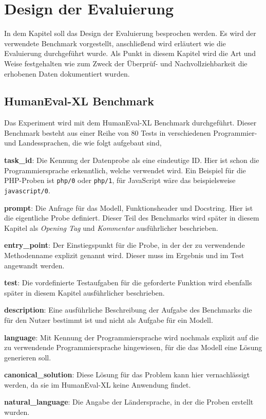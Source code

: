 

\section{Design der Evaluierung}
In dem Kapitel soll das Design der Evaluierung besprochen werden. Es wird der verwendete Benchmark vorgestellt, anschließend wird erläutert wie die Evaluierung durchgeführt wurde. Als Punkt in diesem Kapitel wird die Art und Weise festgehalten wie zum Zweck der Überprüf- und Nachvollziehbarkeit die erhobenen Daten dokumentiert wurden.

\subsection{HumanEval-XL Benchmark}\label{subsec:structor_of_humaneval_xl}
Das Experiment wird mit dem HumanEval-XL Benchmark durchgeführt. Dieser Benchmark besteht aus einer Reihe von 80 Tests in verschiedenen Programmier- und Landessprachen, die wie folgt aufgebaut sind,

\begin{myenumerate}
	\item \textbf{task\_id}: Die Kennung der Datenprobe als eine eindeutige ID. Hier ist schon die Programmiersprache erkenntlich, welche verwendet wird. Ein Beispiel für die PHP-Proben ist \texttt{php/0} oder \texttt{php/1}, für JavaScript wäre das beispielsweise \texttt{javascript/0}.
	\item \textbf{prompt}: Die Anfrage für das Modell, Funktionsheader und Docstring. Hier ist die eigentliche Probe definiert. Dieser Teil des Benchmarks wird später in diesem Kapitel als \textit{Opening Tag} und \textit{Kommentar} ausführlicher beschrieben.
	\item \textbf{entry\_point}: Der Einstiegspunkt für die Probe, in der der zu verwendende Methodenname explizit genannt wird. Dieser muss im Ergebnis und im Test angewandt werden.
	\item \textbf{test}: Die vordefinierte Testaufgaben für die geforderte Funktion wird ebenfalls später in diesem Kapitel ausführlicher beschrieben.
	\item \textbf{description}: Eine ausführliche Beschreibung der Aufgabe des Benchmarks die für den Nutzer bestimmt ist und nicht als Aufgabe für ein Modell.
	\item \textbf{language}: Mit Kennung der Programmiersprache wird nochmals explizit auf die zu verwendende Programmiersprache hingewiesen, für die das Modell eine Lösung generieren soll.
	\item \textbf{canonical\_solution}: Diese Lösung für das Problem kann hier vernachlässigt werden, da sie im HumanEval-XL keine Anwendung findet.
	\item \textbf{natural\_language}: Die Angabe der Ländersprache, in der die Proben erstellt wurden.
\end{myenumerate}

